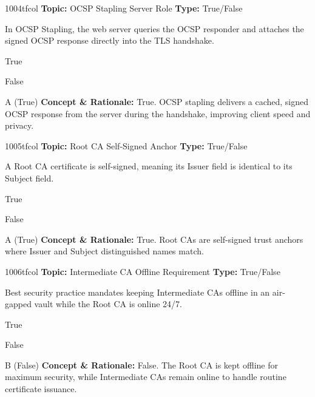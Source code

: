 \begin{qcard}{1004}{tfcol}
\textcolor{darkslate!75}{\small\textbf{Topic:} OCSP Stapling Server Role \hfill \textbf{Type:} True/False}\vspace{0.4em}\par
In OCSP Stapling, the web server queries the OCSP responder and attaches the signed OCSP response directly into the TLS handshake.
\begin{qoptions}
\item True
\item False
\end{qoptions}
\end{qcard}
\nopagebreak
\begin{explainbox}{A (True)}
\textbf{Concept \& Rationale:} True. OCSP stapling delivers a cached, signed OCSP response from the server during the handshake, improving client speed and privacy.
\end{explainbox}

\begin{qcard}{1005}{tfcol}
\textcolor{darkslate!75}{\small\textbf{Topic:} Root CA Self-Signed Anchor \hfill \textbf{Type:} True/False}\vspace{0.4em}\par
A Root CA certificate is self-signed, meaning its Issuer field is identical to its Subject field.
\begin{qoptions}
\item True
\item False
\end{qoptions}
\end{qcard}
\nopagebreak
\begin{explainbox}{A (True)}
\textbf{Concept \& Rationale:} True. Root CAs are self-signed trust anchors where Issuer and Subject distinguished names match.
\end{explainbox}

\begin{qcard}{1006}{tfcol}
\textcolor{darkslate!75}{\small\textbf{Topic:} Intermediate CA Offline Requirement \hfill \textbf{Type:} True/False}\vspace{0.4em}\par
Best security practice mandates keeping Intermediate CAs offline in an air-gapped vault while the Root CA is online 24/7.
\begin{qoptions}
\item True
\item False
\end{qoptions}
\end{qcard}
\nopagebreak
\begin{explainbox}{B (False)}
\textbf{Concept \& Rationale:} False. The Root CA is kept offline for maximum security, while Intermediate CAs remain online to handle routine certificate issuance.
\end{explainbox}

